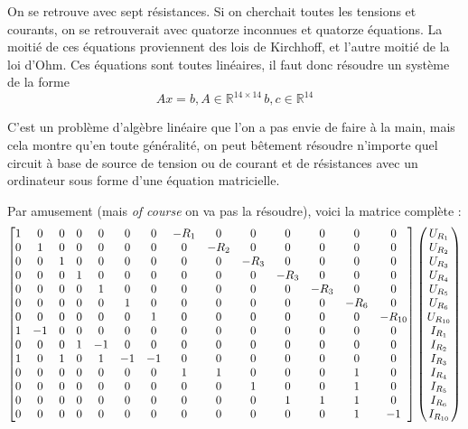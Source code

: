 \documentclass{article}
\begin{document}
On se retrouve avec sept résistances. Si on cherchait toutes les tensions et courants, on se retrouverait avec quatorze inconnues et quatorze équations. La moitié de ces équations proviennent des lois de Kirchhoff, et l'autre moitié de la loi d'Ohm. Ces équations sont toutes linéaires, il faut donc résoudre un système de la forme
\[ Ax = b, A\in\mathbb{R}^{14\times 14}\,b,c\in\mathbb{R}^{14}\]

C'est un problème d'algèbre linéaire que l'on a pas envie de faire à la main, mais cela montre qu'en toute généralité, on peut bêtement résoudre n'importe quel circuit à base de source de tension ou de courant et de résistances avec un ordinateur sous forme d'une équation matricielle.

Par amusement (mais \textit{of course} on va pas la résoudre), voici la matrice complète :
\[
\setcounter{MaxMatrixCols}{14}
\begin{bmatrix}
1&0&0&0&0&0&0&-R_1&0&0&0&0&0&0\\
0&1&0&0&0&0&0&0&-R_2&0&0&0&0&0\\
0&0&1&0&0&0&0&0&0&-R_3&0&0&0&0\\
0&0&0&1&0&0&0&0&0&0&-R_3&0&0&0\\
0&0&0&0&1&0&0&0&0&0&0&-R_3&0&0\\
0&0&0&0&0&1&0&0&0&0&0&0&-R_6&0\\
0&0&0&0&0&0&1&0&0&0&0&0&0&-R_{10}\\
1&-1&0&0&0&0&0&0&0&0&0&0&0&0\\
0&0&0&1&-1&0&0&0&0&0&0&0&0&0\\
1&0&1&0&1&-1&-1&0&0&0&0&0&0&0\\
0&0&0&0&0&0&0&1&1&0&0&0&1&0\\
0&0&0&0&0&0&0&0&0&1&0&0&1&0\\
0&0&0&0&0&0&0&0&0&0&1&1&1&0\\
0&0&0&0&0&0&0&0&0&0&0&0&1&-1
\end{bmatrix}
\begin{pmatrix}U_{R_1}\\U_{R_2}\\U_{R_3}\\U_{R_4}\\U_{R_5}\\U_{R_6}\\U_{R_{10}}\\I_{R_1}\\I_{R_2}\\I_{R_3}\\I_{R_4}\\I_{R_5}\\I_{R_6}\\I_{R_{10}}\\\end{pmatrix}
\]
\end{document}
